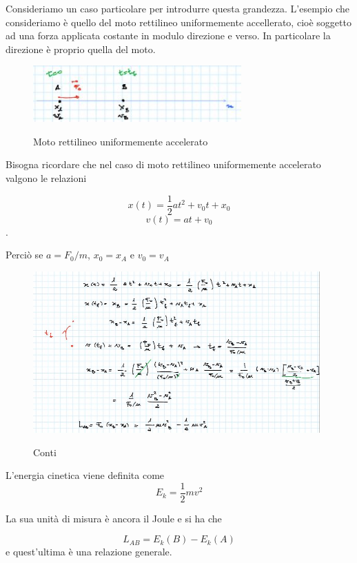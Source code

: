 \begin{esempio}
	Consideriamo un caso particolare per introdurre questa grandezza. L'esempio che consideriamo è quello del moto rettilineo uniformemente accellerato, cioè soggetto ad una forza applicata costante in modulo direzione e verso. In particolare la direzione è proprio quella del moto.
	
	\begin{figure}[h]
		\begin{center}
			\includegraphics[width=8cm]{lezione7/images/4Precorsolavoroedenergia.jpg}\\
			\caption{Moto rettilineo uniformemente accelerato}
		\end{center}
		\end{figure}
	
	Bisogna ricordare che nel caso di moto rettilineo uniformemente accelerato valgono le relazioni
	
	$$x(t) =\frac{1}{2}at^2+v_0 t +x_0$$
	$$v(t)=at+v_0$$.
	
	Perciò se $a=F_0 /m$, $x_0 =x_A$ e $v_0 =v_A$ 
		\begin{figure}[h]
		\begin{center}
			\includegraphics[width=11cm]{lezione7/images/5Precorsolavoroedenergia}\\
			\caption{Conti}
		\end{center}
	\end{figure}
\end{esempio}

\begin{definizione}
	L'energia cinetica viene definita come 
	$$E_k=\frac{1}{2}mv^2$$
	
	La sua unità di misura è ancora il Joule e si ha che 
	
	$$L_{AB}=E_k (B)- E_k (A)$$ 
	e quest'ultima è una relazione generale.
\end{definizione}

